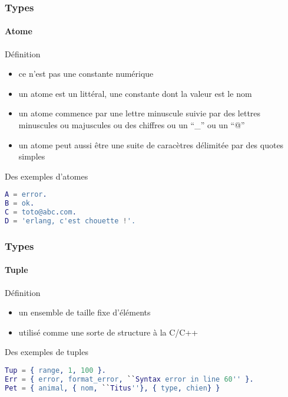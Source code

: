 \begin{frame}[fragile]
  \frametitle{Types}
  \framesubtitle{Atome}

  \begin{block}{Définition}
    \begin{itemize}
    \item ce n'est pas une constante numérique
    \item un atome est un littéral, une constante dont la valeur est le nom
    \item un atome commence par une lettre minuscule suivie par des lettres
      minuscules ou majuscules ou des chiffres ou un ``\_'' ou un ``@''
    \item un atome peut aussi être une suite de caracètres délimitée par
      des quotes simples
    \end{itemize}
  \end{block}

  \begin{exampleblock}{Des exemples d'atomes}
    \begin{lstlisting}[language=erlang]
A = error.
B = ok.
C = toto@abc.com.
D = 'erlang, c'est chouette !'.
    \end{lstlisting}
  \end{exampleblock}

\end{frame}

\begin{frame}[fragile]
  \frametitle{Types}
  \framesubtitle{Tuple}

  \begin{block}{Définition}
    \begin{itemize}
    \item un ensemble de taille fixe d'éléments
    \item utilisé comme une sorte de structure à la C/C++
   \end{itemize}
  \end{block}

  \begin{exampleblock}{Des exemples de tuples}
    \begin{lstlisting}[language=erlang]
Tup = { range, 1, 100 }.
Err = { error, format_error, ``Syntax error in line 60'' }.
Pet = { animal, { nom, ``Titus''}, { type, chien} }
    \end{lstlisting}
  \end{exampleblock}

\end{frame}

